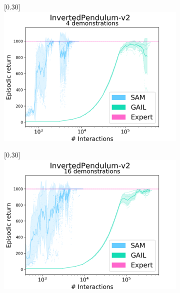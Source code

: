 \begin{figure}
  \center
  \begin{subfigure}[t]{0.49\textwidth}
    \center\scalebox{0.30}[0.30]{\includegraphics{Plots/sam_gail_InvertedPendulum_s0-1-2-3_d4_results_log}}
  \end{subfigure}
  \begin{subfigure}[t]{0.49\textwidth}
    \center\scalebox{0.30}[0.30]{\includegraphics{Plots/sam_gail_InvertedPendulum_s0-1-2-3_d16_results_log}}
  \end{subfigure}
  \begin{subfigure}[t]{0.49\textwidth}

\end{subfigure}
\end{figure}
